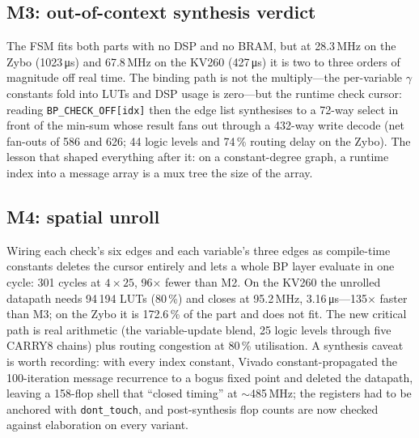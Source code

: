 \subsection*{M3: out-of-context synthesis verdict}
The FSM fits both parts with no DSP and no BRAM, but at 28.3\,MHz on the
Zybo (1023\,\si{\micro\second}) and 67.8\,MHz on the KV260
(427\,\si{\micro\second}) it is two to three orders of magnitude off
real time.
The binding path is not the multiply---the per-variable
$\gamma$ constants fold into LUTs and DSP usage is zero---but the runtime
check cursor: reading \texttt{BP\_CHECK\_OFF[idx]} then the edge list
synthesises to a 72-way select in front of the min-sum whose result fans
out through a 432-way write decode (net fan-outs of 586 and 626; 44 logic
levels and 74\,\% routing delay on the Zybo).
The lesson that shaped everything after it: on a constant-degree graph,
a runtime index into a message array is a mux tree the size of the array.

\subsection*{M4: spatial unroll}
Wiring each check's six edges and each variable's three edges as
compile-time constants deletes the cursor entirely and lets a whole BP layer
evaluate in one cycle: 301 cycles at $4\times 25$, 96$\times$ fewer than M2.
On the KV260 the unrolled datapath needs 94\,194 LUTs (80\,\%) and closes
at 95.2\,MHz, 3.16\,\si{\micro\second}---135$\times$ faster than M3; on the
Zybo it is 172.6\,\% of the part and does not fit.
The new critical path is real arithmetic (the variable-update blend, 25
logic levels through five CARRY8 chains) plus routing congestion at 80\,\%
utilisation.
A synthesis caveat is worth recording: with every index constant, Vivado
constant-propagated the 100-iteration message recurrence to a bogus fixed
point and deleted the datapath, leaving a 158-flop shell that ``closed
timing'' at $\sim$485\,MHz; the registers had to be anchored with
\texttt{dont\_touch}, and post-synthesis flop counts are now checked against
elaboration on every variant.

